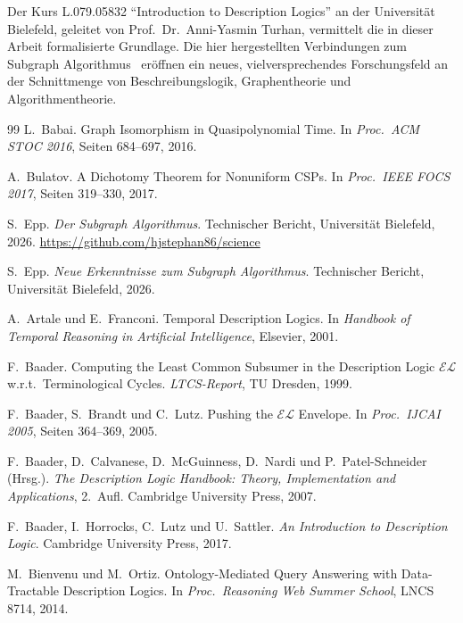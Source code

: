 ﻿\documentclass[a4paper,12pt]{article}
\theoremstyle{definition}
\theoremstyle{plain}
\theoremstyle{remark}
\begin{document}
Der Kurs L.079.05832 ``Introduction to Description Logics''
an der Universit{\"a}t Bielefeld, geleitet von
Prof.\ Dr.\ Anni-Yasmin Turhan, vermittelt die in dieser Arbeit
formalisierte Grundlage. Die hier hergestellten Verbindungen
zum Subgraph Algorithmus~\cite{Epp2026} er{\"o}ffnen ein neues,
vielversprechendes Forschungsfeld an der Schnittmenge von
Beschreibungslogik, Graphentheorie und Algorithmentheorie.

\begin{thebibliography}{99}
L.~Babai.
Graph Isomorphism in Quasipolynomial Time.
In \textit{Proc.\ ACM STOC 2016}, Seiten 684--697, 2016.

A.~Bulatov.
A Dichotomy Theorem for Nonuniform CSPs.
In \textit{Proc.\ IEEE FOCS 2017}, Seiten 319--330, 2017.

S.~Epp.
\textit{Der Subgraph Algorithmus}.
Technischer Bericht, Universit{\"{a}}t Bielefeld, 2026.
\url{https://github.com/hjstephan86/science}

S.~Epp.
\textit{Neue Erkenntnisse zum Subgraph Algorithmus}.
Technischer Bericht, Universit{\"{a}}t Bielefeld, 2026.



A.~Artale und E.~Franconi.
Temporal Description Logics.
In \textit{Handbook of Temporal Reasoning in Artificial Intelligence},
Elsevier, 2001.

F.~Baader.
Computing the Least Common Subsumer in the Description Logic
$\mathcal{EL}$ w.r.t.\ Terminological Cycles.
\textit{LTCS-Report}, TU Dresden, 1999.

F.~Baader, S.~Brandt und C.~Lutz.
Pushing the $\mathcal{EL}$ Envelope.
In \textit{Proc.\ IJCAI 2005}, Seiten 364--369, 2005.

F.~Baader, D.~Calvanese, D.~McGuinness, D.~Nardi und P.~Patel-Schneider (Hrsg.).
\textit{The Description Logic Handbook: Theory, Implementation
and Applications}, 2.\ Aufl.
Cambridge University Press, 2007.

F.~Baader, I.~Horrocks, C.~Lutz und U.~Sattler.
\textit{An Introduction to Description Logic}.
Cambridge University Press, 2017.

M.~Bienvenu und M.~Ortiz.
Ontology-Mediated Query Answering with Data-Tractable Description Logics.
In \textit{Proc.\ Reasoning Web Summer School},
LNCS 8714, 2014.


\end{thebibliography}
\end{document}
